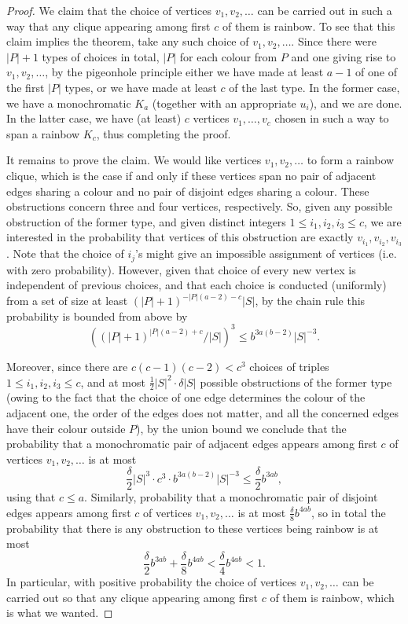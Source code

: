 \documentclass[11pt]{article}
\theoremstyle{plain}
\theoremstyle{definition}
\begin{document}
\begin{proof}
    We claim that the choice of vertices $v_1,v_2,\dots$ can be carried out in such a way that any clique appearing among first $c$ of them is rainbow. To see that this claim implies the theorem, take any such choice of $v_1,v_2,\dots$. Since there were $|P|+1$ types of choices in total, $|P|$ for each colour from $P$ and one giving rise to $v_1,v_2,\dots$, by the pigeonhole principle either we have made at least $a-1$ of one of the first $|P|$ types, or we have made at least $c$ of the last type. In the former case, we have a monochromatic $K_a$ (together with an appropriate $u_i$), and we are done. In the latter case, we have (at least) $c$ vertices $v_1,\dots,v_c$ chosen in such a way to span a rainbow $K_c$, thus completing the proof.

    It remains to prove the claim. We would like vertices $v_1,v_2,\dots$ to form a rainbow clique, which is the case if and only if these vertices span no pair of adjacent edges sharing a colour and no pair of disjoint edges sharing a colour. These obstructions concern three and four vertices, respectively. So, given any possible obstruction of the former type, and given distinct integers $1\le i_1,i_2,i_3\le c$, we are interested in the probability that vertices of this obstruction are exactly $v_{i_1},v_{i_2},v_{i_3}$. Note that the choice of $i_j$'s might give an impossible assignment of vertices (i.e. with zero probability). However, given that choice of every new vertex is independent of previous choices, and that each choice is conducted (uniformly) from a set of size at least $(|P|+1)^{-|P|(a-2)-c}|S|$, by the chain rule this probability is bounded from above by
    $$\left( (|P|+1)^{|P|(a-2)+c}/|S| \right)^3\le b^{3a(b-2)}|S|^{-3}.$$

    Moreover, since there are $c(c-1)(c-2)<c^3$ choices of triples $1\le i_1,i_2,i_3\le c$, and at most $\frac{1}{2}|S|^2\cdot \delta|S|$ possible obstructions of the former type (owing to the fact that the choice of one edge determines the colour of the adjacent one, the order of the edges does not matter, and all the concerned edges have their colour outside $P$), by the union bound we conclude that the probability that a monochromatic pair of adjacent edges appears among first $c$ of vertices $v_1,v_2,\dots$ is at most
    $$\frac{\delta}{2}|S|^3\cdot c^3\cdot b^{3a(b-2)}|S|^{-3}\le \frac{\delta}{2}b^{3ab},$$
    using that $c\le a$. Similarly, probability that a monochromatic pair of disjoint edges appears among first $c$ of vertices $v_1,v_2,\dots$ is at most $\frac{\delta}{8}b^{4ab}$, so in total the probability that there is any obstruction to these vertices being rainbow is at most
    $$\frac{\delta}{2}b^{3ab}+\frac{\delta}{8}b^{4ab}<\frac{\delta}{4}b^{4ab}<1.$$
    In particular, with positive probability the choice of vertices $v_1,v_2,\dots$ can be carried out so that any clique appearing among first $c$ of them is rainbow, which is what we wanted.
\end{proof}
\end{document}
